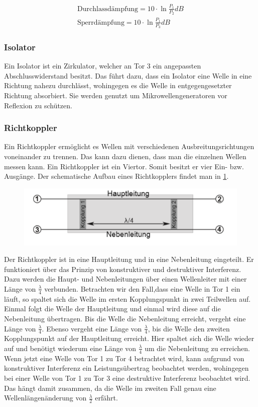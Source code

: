 \begin{align}
	\text{Durchlassdämpfung} = 10 \cdot \ln{\frac{P_1}{P_2}}dB \\
	\text{Sperrdämpfung} =  10 \cdot \ln{\frac{P_1}{P_3}}dB 
\end{align}

\subsubsection{Isolator}
Ein Isolator ist ein Zirkulator, welcher an Tor 3 ein angepassten Abschlusswiderstand besitzt. Das führt dazu, dass ein Isolator eine Welle in eine Richtung nahezu durchlässt, wohingegen es die Welle in entgegengesetzter Richtung absorbiert. Sie werden genutzt um Mikrowellengeneratoren vor Reflexion zu schützen.

\subsubsection{Richtkoppler}
Ein Richtkoppler ermöglicht es Wellen mit verschiedenen Ausbreitungsrichtungen voneinander zu trennen. Das kann dazu dienen, dass man die einzelnen Wellen messen kann. Ein Richtkoppler ist ein Viertor. Somit besitzt er vier Ein- bzw. Ausgänge. Der schematische Aufbau eines Richtkopplers findet man in \cref{RB}. 
\begin{figure}[h!]
	\centering
	\includegraphics[scale = 1]{Richt-Bild.PNG}
	\caption{}
	\label{RB}
\end{figure}
Der Richtkoppler ist in eine Hauptleitung und in eine Nebenleitung eingeteilt. Er funktioniert über das Prinzip von konstruktiver und destruktiver Interferenz. Dazu werden die Haupt- und Nebenleitungen über einen Wellenleiter mit  einer Länge von $\frac{\lambda}{4}$ verbunden. Betrachten wir den Fall,dass eine Welle in Tor 1 ein läuft, so spaltet sich die Welle im ersten Kopplungspunkt in zwei Teilwellen auf. Einmal folgt die Welle der Hauptleitung und einmal wird diese auf die Nebenleitung übertragen. Bis die Welle die Nebenleitung erreicht, vergeht eine Länge von $\frac{\lambda}{4}$. Ebenso vergeht eine Länge von $\frac{\lambda}{4}$, bis die Welle den zweiten Kopplungspunkt auf der Hauptleitung erreicht. Hier spaltet sich die Welle wieder auf und benötigt wiederum eine Länge von $\frac{\lambda}{4}$ um die Nebenleitung zu erreichen. Wenn jetzt eine Welle von Tor 1 zu Tor 4 betrachtet wird, kann aufgrund von konstruktiver Interferenz ein Leistungsübertrag beobachtet werden, wohingegen bei einer Welle von Tor 1 zu Tor 3 eine destruktive Interferenz beobachtet wird. Das hängt damit zusammen, da die Welle im zweiten Fall genau eine Wellenlängenänderung von $\frac{\lambda}{2}$ erfährt.
